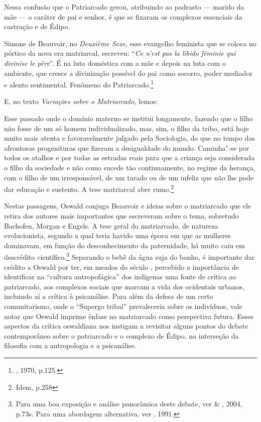 Nessa confusão que o Patriarcado gerou, atribuindo ao padrasto --- marido
da mãe --- o caráter de pai e senhor, é que se fixaram os complexos
essenciais da castração e de Édipo.

Simone de Beauvoir, no \emph{Deuxième Sexe}, esse evangelho feminista
que se coloca no pórtico da nova era matriarcal, escreveu: ``\emph{Ce
n'est pas la libido féminie qui divinise le père}''. É na luta doméstica
com a mãe e depois na luta com o ambiente, que cresce a divinização
possível do pai como socorro, poder mediador e alento sentimental.
Fenômeno do Patriarcado.\footnote{, 1970, p.125.}

E, no texto \emph{Variações sobre o Matriarcado,} lemos:

Esse passado onde o domínio materno se institui longamente, fazendo que
o filho não fosse de um só homem individualizado, mas, sim, o filho da
tribo, está hoje muito mais atenta e favoravelmente julgado pela
Sociologia, do que no tempo das afrontosas progenituras que fizeram a
desigualdade do mundo. Caminha"-se por todos os atalhos e por todas as
estradas reais para que a criança seja considerada o filho da sociedade
e não como sucede tão continuamente, no regime da herança, com o filho
de um irresponsável, de um tarado ou de um infeliz que não lhe pode dar
educação e sustento. A tese matriarcal abre rumo.\footnote{Idem, p.258}

Nestas passagens, Oswald conjuga Beauvoir e ideias sobre o matriarcado
que ele retira dos autores mais importantes que escreveram sobre o tema,
sobretudo Bachofen, Morgan e Engels. A tese geral do matriarcado, de
natureza evolucionista, segundo a qual teria havido uma época em que as
mulheres dominavam, em função do desconhecimento da paternidade, há
muito caiu em descrédito científico.\footnote{Para uma boa exposição e
  análise panorâmica deste debate, ver  \& , 2004, p.73s. Para
  uma abordagem alternativa, ver , 1991.} Separando o bebê da água
suja do banho, é importante dar crédito a Oswald por ter, em meados do
século , percebido a importância de identificar na ``cultura
antropofágica'' dos indígenas uma fonte de crítica ao patriarcado, aos
complexos sociais que marcam a vida dos ocidentais urbanos, incluindo aí
a crítica à psicanálise. Para além da defesa de um certo comunitarismo,
onde o ``Supergo tribal'' prevaleceria sobre os indivíduos, vale notar
que Oswald imprime ênfase no matriarcado como perspectiva futura. Esses
aspectos da crítica oswaldiana nos instigam a revisitar alguns pontos do
debate contemporâneo sobre o patriarcado e o complexo de Édipo, na
interseção da filosofia com a antropologia e a psicanálise.

